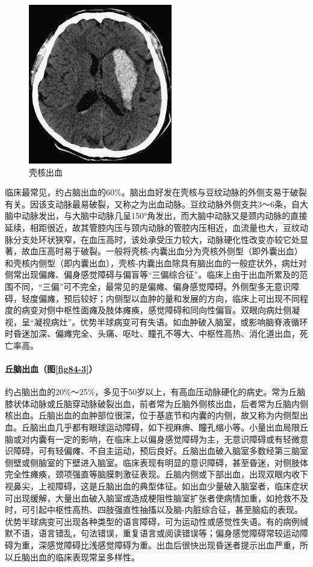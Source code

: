 \begin{figure}[!htbp]
 \centering
 \includegraphics[width=2.46875in,height=2.75in]{./images/Image00377.jpg}
 \captionsetup{justification=centering}
 \caption{壳核出血}
 \label{fig84-2}
  \end{figure} 

临床最常见，约占脑出血的60\%。脑出血好发在壳核与豆纹动脉的外侧支易于破裂有关。因该支动脉最易破裂，又称之为出血动脉。豆纹动脉外侧支共3～6条，自大脑中动脉发出，与大脑中动脉几呈150°角发出，而大脑中动脉又是颈内动脉的直接延续，相距很近，故其管腔内压与颈内动脉的管腔内压相近，血流量也大，豆纹动脉分支处环状狭窄，在血压高时，该处承受压力较大，动脉硬化性改变亦较它处显著，故血压高时易于破裂。一般将壳核-内囊出血分为壳核外侧型（即外囊出血）和壳核内侧型（即内囊出血），壳核-内囊出血除具有脑出血的一般症状外，病灶对侧常出现偏瘫、偏身感觉障碍与偏盲等“三偏综合征”。临床上由于出血所累及的范围不同，“三偏”可不完全，最常见的是偏瘫、偏身感觉障碍。外侧型多无意识障碍，轻度偏瘫，预后较好；内侧型以血肿的量和发展的方向，临床上可出现不同程度的病变对侧中枢性面瘫及肢体瘫痪，感觉障碍和同向性偏盲。双眼向病灶侧凝视，呈“凝视病灶”。优势半球病变可有失语。如血肿破入脑室，或影响脑脊液循环时昏迷加深、偏瘫完全、头痛、呕吐、瞳孔不等大、中枢性高热、消化道出血，死亡率高。

\paragraph{丘脑出血（图\ref{fig84-3}）}

约占脑出血的20\%～25\%，多见于50岁以上，有高血压动脉硬化的病史。常为丘脑膝状体动脉或丘脑穿动脉破裂出血，前者常为丘脑外侧核出血，后者常为丘脑内侧核出血。丘脑出血的血肿部位很深，位于基底节和内囊的内侧，故又称为内侧型出血。丘脑出血几乎都有眼球运动障碍，如下视麻痹、瞳孔缩小等。小量出血局限丘脑或对内囊有一定的影响，在临床上以偏身感觉障碍为主，无意识障碍或有轻微意识障碍，可有轻偏瘫、不自主运动，预后良好。丘脑出血破入脑室多数经第三脑室侧壁或侧脑室的下壁进入脑室。临床表现有明显的意识障碍，甚至昏迷，对侧肢体完全性瘫痪，颈项强直等脑膜刺激征表现。丘脑内侧或下部出血，出现双眼内收下视鼻尖，上视障碍，这是丘脑出血的典型体征。如出血少量破入脑室者，临床症状可出现缓解，大量出血破入脑室或造成梗阻性脑室扩张者使病情加重，如抢救不及时，可引起中枢性高热、四肢强直性抽搐以及脑-内脏综合征，甚至脑疝的表现。优势半球病变可出现各种类型的语言障碍，可为运动性或感觉性失语。有的病例缄默不语，语言错乱，句法错误，重复语言或阅读错误等；偏身感觉障碍常较运动障碍为重，深感觉障碍比浅感觉障碍为重。出血后很快出现昏迷者提示出血严重，所以丘脑出血的临床表现常呈多样性。

